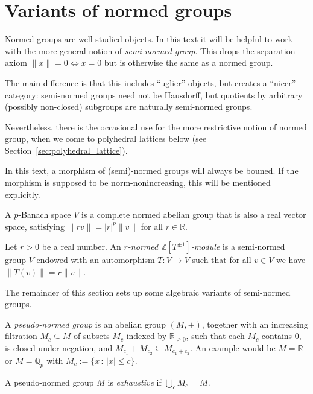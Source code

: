 \section{Variants of normed groups}
\label{sec:normed_groups}

\begin{remark}
  Normed groups are well-studied objects.
  In this text it will be helpful to work with
  the more general notion of \emph{semi-normed group}.
  This drops the separation axiom $\|x\| = 0 \iff x = 0$
  but is otherwise the same as a normed group.

  The main difference is that this includes ``uglier'' objects,
  but creates a ``nicer'' category:
  semi-normed groups need not be Hausdorff,
  but quotients by arbitrary (possibly non-closed) subgroups
  are naturally semi-normed groups.

  Nevertheless, there is the occasional use for the more restrictive
  notion of normed group, when we come to polyhedral lattices below
  (see Section~\ref{sec:polyhedral_lattice}).

  In this text, a morphism of (semi)-normed groups will always be bouned.
  If the morphism is supposed to be norm-nonincreasing,
  this will be mentioned explicitly.
\end{remark}

\begin{definition}
  \label{p-banach}
  A $p$-Banach space $V$ is a complete normed abelian group
  that is also a real vector space,
  satisfying $\|rv\| = |r|^p\|v\|$ for all $r \in \mathbb R$.
\end{definition}

\begin{definition}
  \label{normed_with_aut}
  \leanok
  Let $r > 0$ be a real number.
  An \emph{$r$-normed $\mathbb Z[T^{\pm 1}]$-module}
  is a semi-normed group $V$
  endowed with an automorphism $T \colon V \to V$ such that
  for all $v \in V$ we have $\|T(v)\| = r\|v\|$.
\end{definition}

The remainder of this section sets up some algebraic variants of semi-normed groups.

\begin{definition}
  \label{pseudo_normed_group}
  \leanok
  A \emph{pseudo-normed group} is an abelian group $(M,+)$,
  together with an increasing filtration $M_c \subseteq M$ of subsets $M_c$ indexed by $\mathbb R_{\ge 0}$,
  such that each $M_c$ contains $0$, is closed under negation,
  and $M_{c_1} + M_{c_2} \subseteq M_{c_1 + c_2}$. An example would be $M=\mathbb{R}$ or $M=\mathbb{Q}_p$ with $M_c :=\{x\,:\,|x|\leq c\}$.

  A pseudo-normed group $M$ is \emph{exhaustive} if $\bigcup_c M_c = M$.
\end{definition}

